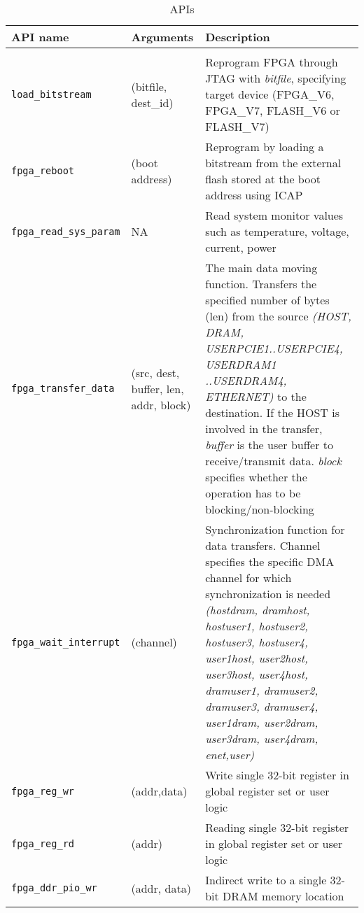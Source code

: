 \begin{longtable}{|l|l|p{6.5cm}|}

    \caption{APIs\label{tab:apis}}\\\hline
    API name         &    Arguments                     & Description \\\hline
    \rowcolor[gray]{0.9}
    \multicolumn{2}{|l}{High level APIs} &             \\ \hline
    {\texttt{load\_bitstream}}           &    (bitfile, dest\_id)           &    Reprogram FPGA through JTAG with \emph{bitfile}, specifying target device (FPGA\_V6, FPGA\_V7, FLASH\_V6 or FLASH\_V7) \\\hline
    {\texttt{fpga\_reboot}}              &    (boot address)                &    Reprogram by loading a bitstream from the external flash stored at the boot address using ICAP \\\hline
    {\texttt{fpga\_read\_sys\_param}}    &    NA                            &    Read system monitor values such as temperature, voltage, current, power\\\hline
    {\texttt{fpga\_transfer\_data}}      &    (src, dest, buffer, len, addr, block)  & The main data moving function. Transfers the specified number of bytes (len) from the source \emph{(HOST, DRAM, USERPCIE1..USERPCIE4, USERDRAM1 ..USERDRAM4, ETHERNET)} to the destination.
    If the HOST is involved in the transfer, \emph{buffer} is the user buffer to receive/transmit data. \emph{block} specifies whether the operation has to be blocking/non-blocking\\\hline
    {\texttt{fpga\_wait\_interrupt}}     &    (channel)                     &    Synchronization function for data transfers. Channel specifies the specific DMA channel for which synchronization is needed 
    \emph{(hostdram, dramhost, hostuser1, hostuser2, hostuser3, hostuser4, user1host, user2host, user3host, user4host, dramuser1, dramuser2, dramuser3, dramuser4, user1dram, user2dram, user3dram, user4dram, enet,user)}\\\hline
    {\texttt{fpga\_reg\_wr}}             &    (addr,data)                   &    Write single 32-bit register in global register set or user logic\\\hline
    {\texttt{fpga\_reg\_rd}}             &    (addr)                        &    Reading single 32-bit register in global register set or user logic\\\hline
    {\texttt{fpga\_ddr\_pio\_wr}}        &    (addr, data)                  &    Indirect write to a single 32-bit DRAM memory location\\\hline

\end{longtable}
